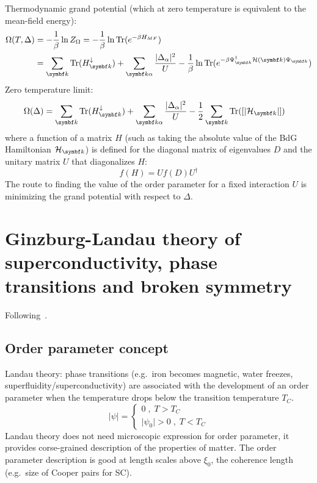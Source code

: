 \documentclass[../notes.tex]{subfiles}
\begin{document}
Thermodynamic grand potential (which at zero temperature is equivalent to the mean-field energy):
\begin{align}
	\Omega (T, \Delta) &= -\frac{1}{\beta} \ln{Z_{\Omega}} = -\frac{1}{\beta} \ln{\Tr(e^{-\beta H_{MF}})} \\
	&= \sum_{\vb{k}} \Tr(H^{\downarrow}_{\vb{k}}) + \sum_{\vb{k} \alpha} \frac{\vert \Delta_{\alpha} \vert^2}{U} - \frac{1}{\beta} \ln{\Tr(e^{-\beta \Psi_{\vb{k}}^{\dagger} \mathcal{H} (\vb{k}) \Psi_{\vb{k}}})}
\end{align}
Zero temperature limit:
\begin{align}
	\Omega (\Delta) &= \sum_{\vb{k}} \Tr(H^{\downarrow}_{\vb{k}}) + \sum_{\vb{k} \alpha} \frac{\vert \Delta_{\alpha} \vert^2}{U} - \frac{1}{2} \sum_{\vb{k}} \Tr([\vert \mathcal{H}_{\vb{k}} \vert])
\end{align}
where a function of a matrix \(H\) (such as taking the absolute value of the BdG Hamiltonian \(\mathcal{H}_{\vb{k}}\)) is defined for the diagonal matrix of eigenvalues \(D\) and the unitary matrix \(U\) that diagonalizes \(H\):
\begin{equation}
	f(H) = U f(D) U^{\dagger}
\end{equation}
The route to finding the value of the order parameter for a fixed interaction \(U\) is minimizing the grand potential with respect to \(\Delta\).


\section{Ginzburg-Landau theory of superconductivity, phase transitions and broken symmetry }\label{sec:Ginzburg-Landau theory of superconductivity}

Following~\cite[ch. 11]{colemanIntroductionManyBodyPhysics2015}.

\subsection{Order parameter concept}

Landau theory: phase transitions (e.g.\ iron becomes magnetic, water freezes, superfluidity/superconductivity) are associated with the development of an order parameter when the temperature drops below the transition temperature \(T_C\).
\begin{equation}
	\vert \psi \vert =
	\begin{cases}
		0\;,\; T > T_C \\
		\vert \psi_0 \vert > 0 \;,\; T < T_C
	\end{cases}
\end{equation}
Landau theory does not need microscopic expression for order parameter, it provides corse-grained description of the properties of matter.
The order parameter description is good at length scales above \(\xi_0\), the coherence length (e.g.\ size of Cooper pairs for SC).
\end{document}

